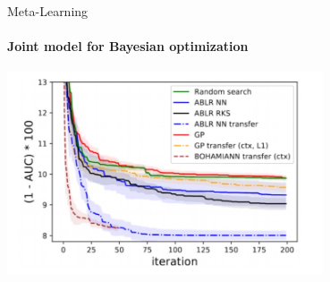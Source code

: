 \begin{frame}[c]{Meta-Learning}
\framesubtitle{Joint model for Bayesian optimization}

\centering
\includegraphics[width=0.7\textwidth]{images/meta_learning/perrone_res.jpg}

\end{frame}

